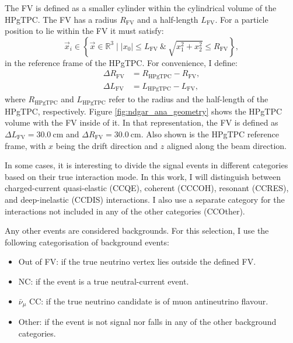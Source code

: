 The FV is defined as a smaller cylinder within the cylindrical volume of the HPgTPC. The FV has a radius $R_{\mathrm{FV}}$ and a half-length $L_{\mathrm{FV}}$. For a particle position to lie within the FV it must satisfy:
\begin{equation}
    \vec{x}_{i} \in \left\{\vec{x} \in \mathbb{R}^{3} \mid |x_{0}| \leq L_{\mathrm{FV}} ~ \& ~ \sqrt{x_{1}^{2}+x_{2}^{2}} \leq R_{\mathrm{FV}}\right\},
\end{equation}
in the reference frame of the HPgTPC. For convenience, I define:
\begin{equation}
    \begin{split}
        \Delta R_{\mathrm{FV}} &= R_{\mathrm{HPgTPC}} - R_{\mathrm{FV}}, \\
        \Delta L_{\mathrm{FV}} &= L_{\mathrm{HPgTPC}} - L_{\mathrm{FV}},
    \end{split}
\end{equation}
where $R_{\mathrm{HPgTPC}}$ and $L_{\mathrm{HPgTPC}}$ refer to the radius and the half-length of the HPgTPC, respectively. Figure \ref{fig:ndgar_ana_geometry} shows the HPgTPC volume with the FV inside of it. In that representation, the FV is defined as $\Delta L_{\mathrm{FV}} = 30.0 ~ \mathrm{cm}$ and $\Delta R_{\mathrm{FV}} = 30.0 ~ \mathrm{cm}$. Also shown is the HPgTPC reference frame, with $x$ being the drift direction and $z$ aligned along the beam direction.

In some cases, it is interesting to divide the signal events in different categories based on their true interaction mode. In this work, I will distinguish between charged-current quasi-elastic (CCQE), coherent (CCCOH), resonant (CCRES), and deep-inelastic (CCDIS) interactions. I also use a separate category for the interactions not included in any of the other categories (CCOther).

Any other events are considered backgrounds. For this selection, I use the following categorisation of background events:
\begin{itemize}
    \item Out of FV: if the true neutrino vertex lies outside the defined FV.
    \item NC: if the event is a true neutral-current event.
    \item $\bar{\nu}_{\mu}$ CC: if the true neutrino candidate is of muon antineutrino flavour.
    \item Other: if the event is not signal nor falls in any of the other background categories.
\end{itemize}

